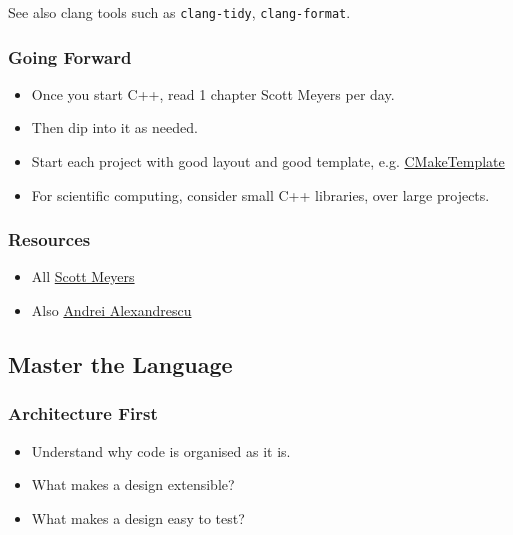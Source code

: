 See also clang tools such as \texttt{clang-tidy}, \texttt{clang-format}.

\subsubsection{Going Forward}\label{going-forward-1}

\begin{itemize}
\itemsep1pt\parskip0pt
\item
  Once you start C++, read 1 chapter Scott Meyers per day.
\item
  Then dip into it as needed.
\item
  Start each project with good layout and good template, e.g.
  \href{https://github.com/MattClarkson/CMakeCatchTemplate}{CMakeTemplate}
\item
  For scientific computing, consider small C++ libraries, over large
  projects.
\end{itemize}

\subsubsection{Resources}\label{resources-1}

\begin{itemize}
\itemsep1pt\parskip0pt
\item
  All \href{https://www.aristeia.com/books.html}{Scott Meyers}
\item
  Also
  \href{https://www.amazon.co.uk/Modern-Design-Generic-Programming-Patterns/dp/0201704315}{Andrei
  Alexandrescu}
\end{itemize}

\subsection{Master the Language}\label{master-the-language}

\subsubsection{Architecture First}\label{architecture-first}

\begin{itemize}
\itemsep1pt\parskip0pt
\item
  Understand why code is organised as it is.
\item
  What makes a design extensible?
\item
  What makes a design easy to test?
\end{itemize}

